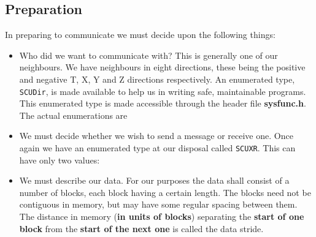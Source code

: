 \subsection{Preparation}
In preparing to communicate we must decide upon the following things:
\begin{itemize}
\item
Who did we want to communicate with? This is generally one of our
neighbours. We have neighbours in eight directions, these being 
the positive and negative T, X, Y and Z directions respectively. An enumerated type, {\tt SCUDir}, is made available to help us in writing safe, 
maintainable programs. This enumerated type is made accessible through
the header file {\bf sysfunc.h}. The actual enumerations are
\item 
We must decide whether we wish to send a message or receive one.
Once again we have an enumerated type at our disposal called
{\tt SCUXR}. This can have only two values:
\item
We must describe our data. For our purposes the data shall consist 
of a number of blocks, each block having a certain length. The blocks
need not be contiguous in memory, but may have some regular spacing
between them. The distance in memory ({\bf in units of blocks}) separating
the {\bf start of one block} from the {\bf start of the next one} is called
the data stride.


\end{itemize}
